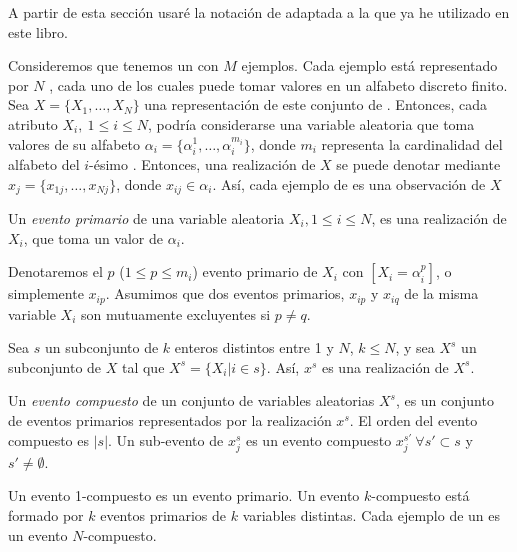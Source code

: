 \ABIERTO
\clearpage
A partir de esta sección usaré la notación de \citet{WangWong-FromAssociationToClassificationInferenceUsingWeightOfEvidence-2003} adaptada a la que ya he utilizado en este libro.


Consideremos que tenemos un \dataset \D con $M$ ejemplos. Cada ejemplo está representado por $N$ \atributos, cada uno de los cuales puede tomar valores en un alfabeto discreto finito. Sea $X = \{X_1,\ldots,X_N\}$ una representación de este conjunto de \atributos. Entonces, cada atributo $X_i,\ 1\leq i\leq N$, podría considerarse una variable aleatoria que toma valores de su alfabeto $\alpha_i = \{\alpha_i^1,\ldots,\alpha_i^{m_i}\}$, donde $m_i$ representa la cardinalidad del alfabeto del $i$-ésimo \atributo. Entonces, una realización de $X$ se puede denotar mediante $x_j = \{x_{1j},\ldots,x_{Nj}\}$, donde $x_{ij} \in \alpha_i$. Así, cada ejemplo de \D es una observación de $X$

\begin{Definition}
   Un \emph{evento primario} de una variable aleatoria $X_i, 1\leq i\leq N$, es una realización de $X_i$, que toma un valor de $\alpha_i$.
\label{def:evento-primario}
\end{Definition}

Denotaremos el $p$ ($1\leq p\leq m_i$) evento primario de $X_i$ con $[X_i = \alpha_i^p]$, o simplemente $x_{ip}$. Asumimos que dos eventos primarios, $x_{ip}$ y $x_{iq}$ de la misma variable $X_i$ son mutuamente excluyentes si $p\neq q$.

Sea $s$ un subconjunto de $k$ enteros distintos entre 1 y $N$, $k\leq N$, y sea $X^s$ un subconjunto de $X$ tal que $X^s = \{X_i | i\in s\}$. Así, $x^s$ es una realización de $X^s$.

\begin{Definition}
   Un \emph{evento compuesto} de un conjunto de variables aleatorias $X^s$, es un conjunto de eventos primarios representados por la realización $x^s$. El orden del evento compuesto es $|s|$. Un sub-evento de $x_j^s$ es un evento compuesto $x_j^{s'}\ \forall s'\subset s$ y $s'\neq\emptyset$.
\label{def:evento-compuesto}
\end{Definition}

Un evento 1-compuesto es un evento primario. Un evento $k$-compuesto está formado por $k$ eventos primarios de $k$ variables distintas. Cada ejemplo de un \dataset es un evento $N$-compuesto.

